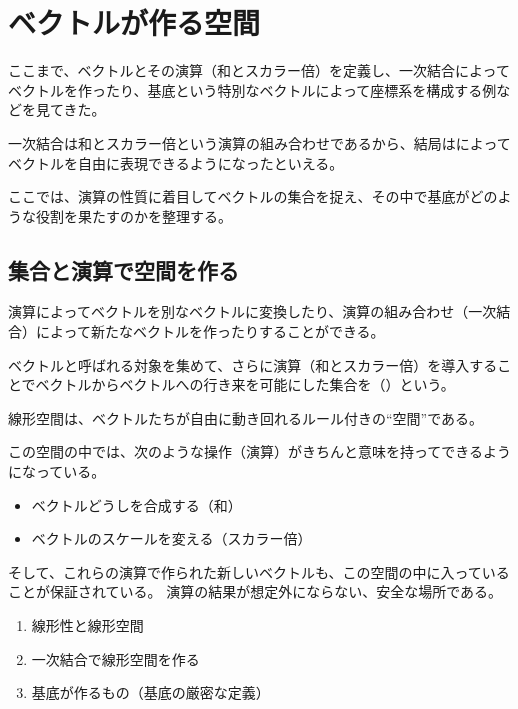 \documentclass[../../imaging-math]{subfiles}
\begin{document}
\section{ベクトルが作る空間}

ここまで、ベクトルとその演算（和とスカラー倍）を定義し、一次結合によってベクトルを作ったり、基底という特別なベクトルによって座標系を構成する例などを見てきた。

一次結合は和とスカラー倍という演算の組み合わせであるから、結局はによってベクトルを自由に表現できるようになったといえる。

\br

ここでは、演算の性質に着目してベクトルの集合を捉え、その中で基底がどのような役割を果たすのかを整理する。

\subsection{集合と演算で空間を作る}

演算によってベクトルを別なベクトルに変換したり、演算の組み合わせ（一次結合）によって新たなベクトルを作ったりすることができる。

\br

ベクトルと呼ばれる対象を集めて、さらに演算（和とスカラー倍）を導入することでベクトルからベクトルへの行き来を可能にした集合を（）という。

\br

線形空間は、ベクトルたちが自由に動き回れるルール付きの“空間”である。

この空間の中では、次のような操作（演算）がきちんと意味を持ってできるようになっている。

\begin{itemize}
  \item ベクトルどうしを合成する（和）
  \item ベクトルのスケールを変える（スカラー倍）
\end{itemize}

そして、これらの演算で作られた新しいベクトルも、この空間の中に入っていることが保証されている。
演算の結果が想定外にならない、安全な場所である。

\wip

\begin{mindflow}
  \begin{enumerate}
    \item 線形性と線形空間
    \item 一次結合で線形空間を作る
    \item 基底が作るもの（基底の厳密な定義）
  \end{enumerate}
\end{mindflow}
\end{document}
